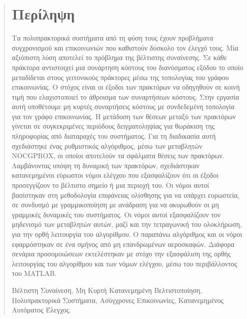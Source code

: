 \begin{abstract}
    \chapter{Περίληψη}
         Τα πολυπρακτορικά συστήματα από τη φύση τους έχουν προβλήματα συγχρονισμού και επικοινωνιών που καθιστούν δύσκολο τον έλεγχό τους. Μία αξιόπιστη λύση αποτελεί το πρόβλημα της βέλτιστης συναίνεσης. Σε κάθε πράκτορα αντιστοιχεί μια συνάρτηση κόστους του διανύσματος εξόδου το οποίο μεταδίδεται στους γειτονικούς πράκτορες μέσω της τοπολογίας του γράφου επικοινωνίας. Ο στόχος είναι οι έξοδοι των πρακτόρων να οδηγηθούν σε κοινή τιμή που ελαχιστοποιεί το άθροισμα των συναρτήσεων κόστους. Στην εργασία αυτή υποθέτουμε μη κυρτές συναρτήσεις κόστους με συνδεδεμένη τοπολογία για τον γράφο επικοινωνίας. Η μετάδοση των θέσεων μεταξύ των πρακτόρων γίνεται σε συγκεκριμένες περιόδους δειγματοληψίας για θωράκιση της πληροφορίας από διαταραχές του συστήματος. Για τη διαδικασία αυτή σχεδιάστηκε ένας ρυθμιστικός αλγόριθμος, μέσω των μεταβλητών NOCGPROX, οι οποίοι αποτελούν τα σφάλματα θέσεις των πρακτόρων. Λαμβάνοντας υπόψη τη δυναμική των πρακτόρων, σχεδιάστηκαν κατανεμημένοι εύρωστοι νόμοι ελέγχου που εξασφαλίζουν ότι οι έξοδοι προσεγγίζουν το βέλτιστο σημείο ή μια περιοχή του. Οι νόμοι αυτοί βασίστηκαν στη μεθοδολογία επιφάνειας ολίσθησης για να υπάρχει ευρωστεία, σε συνδυσμό με γραμμικοποίηση με ανάδραση για να ακυρωθούν οι μη γραμμικές δυναμικές του συστήματος. Οι νόμοι αυτοί εξασφαλίζουν τον μηδενισμό των μεταβλητών αυτών, μαζί και την τετραγωνική του ολοκλήρωση, για την ορθή λειτουργία του αλγορίθμου. Ο παραπάνω αλγόριθμος και οι νόμοι εφαρμόστηκαν σε ένα σμήνος από μη επανδρωμένων αεροσκαφών. Διάφορα σενάρια προσομοιώσεων εκτελέστηκαν με στόχο την εξασφάλιση της ορθής λειτουργίας του αλγορίθμου και των νόμων ελέγχου, μέσω του περιβάλλοντος του MATLAB.
        
    \vspace{20mm}
    \vspace{5mm}
    \begin{flushleft}
        Βέλτιστη Συναίνεση, Μη Κυρτή Κατανεμημένη Βελτιστοποίηση, Πολυπρακτορικά Συστήματα, Ασύγχρονες Επικοινωνίες, Κατανεμημένος Αυτόματος Έλεγχος.
     \end{flushleft}
\end{abstract}
